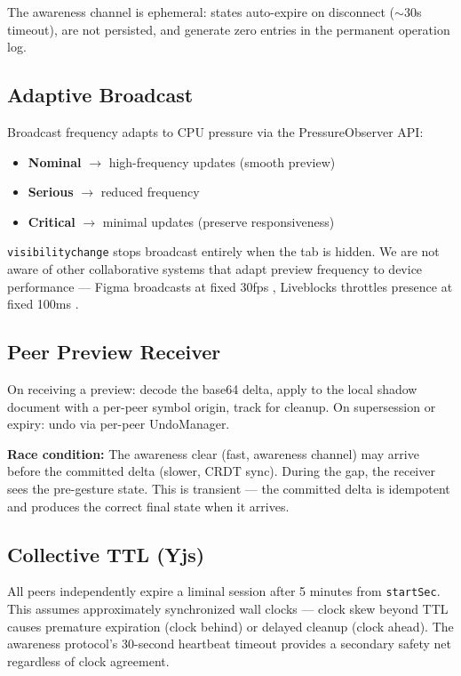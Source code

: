 The awareness channel is ephemeral: states auto-expire on disconnect ($\sim$30s timeout), are not persisted, and generate zero entries in the permanent operation log.

\subsection{Adaptive Broadcast}

Broadcast frequency adapts to CPU pressure via the PressureObserver API:

\begin{itemize}
    \item \textbf{Nominal} $\rightarrow$ high-frequency updates (smooth preview)
    \item \textbf{Serious} $\rightarrow$ reduced frequency
    \item \textbf{Critical} $\rightarrow$ minimal updates (preserve responsiveness)
\end{itemize}

\texttt{visibilitychange} stops broadcast entirely when the tab is hidden. We are not aware of other collaborative systems that adapt preview frequency to device performance --- Figma broadcasts at fixed 30fps \cite{figma:multiplayer}, Liveblocks throttles presence at fixed 100ms \cite{liveblocks:undo}.

\subsection{Peer Preview Receiver}

On receiving a preview: decode the base64 delta, apply to the local shadow document with a per-peer symbol origin, track for cleanup. On supersession or expiry: undo via per-peer UndoManager.

\textbf{Race condition:} The awareness clear (fast, awareness channel) may arrive before the committed delta (slower, CRDT sync). During the gap, the receiver sees the pre-gesture state. This is transient --- the committed delta is idempotent and produces the correct final state when it arrives.

\subsection{Collective TTL (Yjs)}

All peers independently expire a liminal session after 5 minutes from \texttt{startSec}. This assumes approximately synchronized wall clocks --- clock skew beyond TTL causes premature expiration (clock behind) or delayed cleanup (clock ahead). The awareness protocol's 30-second heartbeat timeout provides a secondary safety net regardless of clock agreement.





